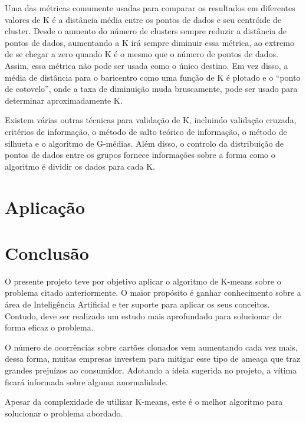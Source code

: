 \documentclass[12pt]{article}
\begin{document}
Uma das métricas comumente usadas para comparar os resultados em diferentes valores de K é a distância média entre os pontos de dados e seu centróide de cluster. Desde o aumento do número de clusters sempre reduzir a distância de pontos de dados, aumentando a K irá sempre diminuir essa métrica, ao extremo de se chegar a zero quando K é o mesmo que o número de pontos de dados. Assim, essa métrica não pode ser usada como o único destino. Em vez disso, a média de distância para o baricentro como uma função de K é plotado e o ``ponto de cotovelo'', onde a taxa de diminuição muda bruscamente, pode ser usado para determinar aproximadamente K.

Existem várias outras técnicas para validação de K, incluindo validação cruzada, critérios de informação, o método de salto teórico de informação, o método de silhueta e o algoritmo de G-médias. Além disso, o controlo da distribuição de pontos de dados entre os grupos fornece informações sobre a forma como o algoritmo é dividir os dados para cada K.

\section{Aplicação}

\section{Conclusão}
O presente projeto teve por objetivo aplicar o algoritmo de K-means sobre o problema citado anteriormente. O maior propósito é ganhar conhecimento sobre a área de Inteligência Artificial e ter suporte para aplicar os seus conceitos. Contudo, deve ser realizado um estudo mais aprofundado para solucionar de forma eficaz o problema. 

O número de ocorrências sobre cartões clonados vem aumentando cada vez mais, dessa forma, muitas empresas investem para mitigar esse tipo de ameaça que traz grandes prejuízos ao consumidor. Adotando a ideia sugerida no projeto, a vítima ficará informada sobre alguma anormalidade.

Apesar da complexidade de utilizar K-means, este é o melhor algoritmo para solucionar o problema abordado.
\end{document}
